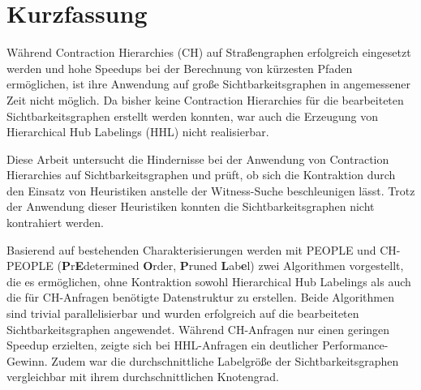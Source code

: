 \chapter{Kurzfassung}

Während Contraction Hierarchies (CH) auf Straßengraphen erfolgreich eingesetzt werden und hohe Speedups bei der Berechnung von kürzesten Pfaden ermöglichen, ist ihre Anwendung auf große Sichtbarkeitsgraphen in angemessener Zeit nicht möglich.
Da bisher keine Contraction Hierarchies für die bearbeiteten Sichtbarkeitsgraphen erstellt werden konnten, war auch die Erzeugung von Hierarchical Hub Labelings (HHL) nicht realisierbar.

Diese Arbeit untersucht die Hindernisse bei der Anwendung von Contraction Hierarchies auf Sichtbarkeitsgraphen und prüft, ob sich die Kontraktion durch den Einsatz von Heuristiken anstelle der Witness-Suche beschleunigen lässt.
Trotz der Anwendung dieser Heuristiken konnten die Sichtbarkeitsgraphen nicht kontrahiert werden.

Basierend auf bestehenden Charakterisierungen werden mit PEOPLE und CH-PEOPLE (\textbf{P}r\textbf{E}determined \textbf{O}rder, \textbf{P}runed \textbf{L}ab\textbf{e}l) zwei Algorithmen vorgestellt, die es ermöglichen, ohne Kontraktion sowohl Hierarchical Hub Labelings als auch die für CH-Anfragen benötigte Datenstruktur zu erstellen.
Beide Algorithmen sind trivial parallelisierbar und wurden erfolgreich auf die bearbeiteten Sichtbarkeitsgraphen angewendet.
Während CH-Anfragen nur einen geringen Speedup erzielten, zeigte sich bei HHL-Anfragen ein deutlicher Performance-Gewinn.
Zudem war die durchschnittliche Labelgröße der Sichtbarkeitsgraphen vergleichbar mit ihrem durchschnittlichen Knotengrad.